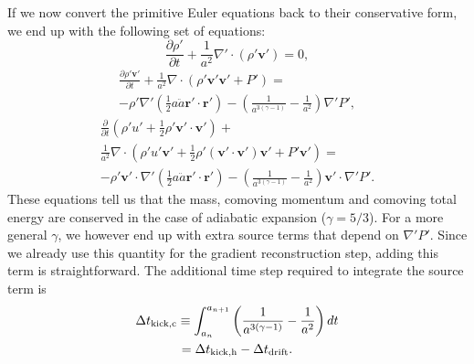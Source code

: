 If we now convert the primitive Euler equations back to their conservative form,
we end up with the following set of equations:
\begin{equation}
\frac{\partial{} \rho{}'}{\partial{} t} + \frac{1}{a^2} \nabla{}' \cdot \left(
\rho{}' \mathbf{v}' \right) = 0,
\end{equation}
\begin{multline}
\frac{\partial{} \rho{}' \mathbf{v}'}{\partial{} t} + \frac{1}{a^2}
\nabla{} \cdot \left( \rho{}' \mathbf{v}'\mathbf{v}' + P' \right) = \\
- \rho{}' \nabla{}' \left( \frac{1}{2} a \ddot{a} \mathbf{r}'\cdot\mathbf{r}'
\right) - \left(\frac{1}{a^{3(\gamma{} - 1)}} - \frac{1}{a^2} \right)
\nabla{}'P',
\end{multline}
\begin{multline}
\frac{\partial{}}{\partial{} t} \left( \rho{}' u' + \frac{1}{2} \rho{}'
\mathbf{v}'\cdot\mathbf{v}' \right) +\\
\frac{1}{a^2}\nabla{} \cdot \left( \rho{}' u' \mathbf{v}' +
\frac{1}{2} \rho{}' \left(\mathbf{v}'\cdot \mathbf{v}'\right)
\mathbf{v}' + P' \mathbf{v}' \right) =\\
- \rho{}' \mathbf{v}'\cdot\nabla{}' \left( \frac{1}{2} a \ddot{a} \mathbf{r}'\cdot
\mathbf{r}' \right) -
\left(\frac{1}{a^{3(\gamma{} - 1)}} - \frac{1}{a^2} \right)
\mathbf{v}'\cdot\nabla{}'P'.
\end{multline}
These equations tell us that the mass, comoving momentum and comoving total
energy are conserved in the case of adiabatic expansion ($\gamma{} = 5/3$).
For a more general $\gamma{}$, we however end up with extra source terms that
depend on $\nabla{}'P'$. Since we already use this quantity for the gradient
reconstruction step, adding this term is straightforward. The additional time
step required to integrate the source term is
\begin{multline}
\Delta{} t_{\rm{} kick,c} \equiv \int_{a_n}^{a_{n+1}}
\left(\frac{1}{a^{3(\gamma{} - 1)}} - \frac{1}{a^2} \right) dt \\ =
\Delta{} t_{\rm{} kick,h} - \Delta{} t_{\rm{} drift}.
\end{multline}
